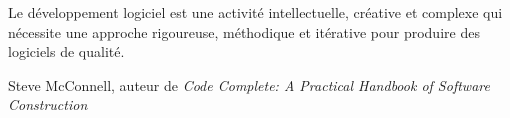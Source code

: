 \epigraph{Le développement logiciel est une activité intellectuelle, créative et complexe qui nécessite une approche rigoureuse, méthodique et itérative pour produire des logiciels de qualité.}{Steve McConnell, auteur de \textit{Code Complete: A Practical Handbook of Software Construction}}